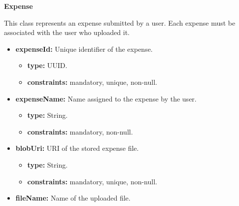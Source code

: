 \textbf{Expense}

This class represents an expense submitted by a user. Each expense must be associated with the user who uploaded it.

\begin{itemize} [leftmargin=0.75cm, noitemsep, label=\textbullet]

    \item \textbf{expenseId:} Unique identifier of the expense.
    
    \begin{itemize} [leftmargin=0.75cm, noitemsep, label=$\circ$]

        \item \textbf{type:} UUID.

        \item \textbf{constraints:} mandatory, unique, non-null.

    \end{itemize}

    \item \textbf{expenseName:} Name assigned to the expense by the user.
    
    \begin{itemize} [leftmargin=0.75cm, noitemsep, label=$\circ$]

        \item \textbf{type:} String.

        \item \textbf{constraints:} mandatory, non-null.

    \end{itemize}

    \item \textbf{blobUri:} URI of the stored expense file.
    
    \begin{itemize} [leftmargin=0.75cm, noitemsep, label=$\circ$]

        \item \textbf{type:} String.

        \item \textbf{constraints:} mandatory, unique, non-null.

    \end{itemize}

    \item \textbf{fileName:} Name of the uploaded file.
    
    \begin{itemize} [leftmargin=0.75cm, noitemsep, label=$\circ$]


\end{itemize}
\end{itemize}
